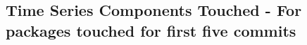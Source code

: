 \subsection{Time Series Components Touched - For packages touched for first five commits} 


\clearpage

